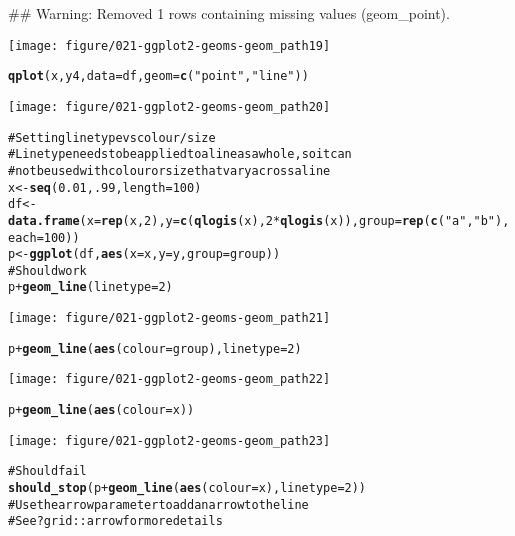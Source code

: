 \documentclass[a4paper,titlepage]{tufte-handout}\usepackage{graphicx, color}
\makeatletter
\def\maxwidth{ %
  \ifdim\Gin@nat@width>\linewidth
    \linewidth
  \else
    \Gin@nat@width
  \fi
}
\newcommand{\hlfunctioncall}[1]{\textcolor[rgb]{0.501960784313725,0,0.329411764705882}{\textbf{#1}}}%
\newcommand{\hlstring}[1]{\textcolor[rgb]{0.6,0.6,1}{#1}}%
\newcommand{\hlcomment}[1]{\textcolor[rgb]{0.180392156862745,0.6,0.341176470588235}{#1}}%
\newenvironment{kframe}{%
 \def\at@end@of@kframe{}%
 \ifinner\ifhmode%
  \def\at@end@of@kframe{\end{minipage}}%
  \begin{minipage}{\columnwidth}%
 \fi\fi%
 \def\FrameCommand##1{\hskip\@totalleftmargin \hskip-\fboxsep
 \colorbox{shadecolor}{##1}\hskip-\fboxsep
     \hskip-\linewidth \hskip-\@totalleftmargin \hskip\columnwidth}%
 \MakeFramed {\advance\hsize-\width
   \@totalleftmargin\z@ \linewidth\hsize
   \@setminipage}}%
 {\par\unskip\endMakeFramed%
 \at@end@of@kframe}
\newenvironment{knitrout}{}{} %
\makeatother
\begin{document}
\begin{knitrout}
\begin{kframe}
{\ttfamily\noindent\textcolor{warningcolor}{\#\# Warning: Removed 1 rows containing missing values (geom\_point).}}\end{kframe}\texttt{[image: figure/021-ggplot2-geoms-geom\_path19]} \begin{kframe}\begin{alltt}
\hlfunctioncall{qplot}(x, y4, data = df, geom = \hlfunctioncall{c}(\hlstring{"point"},\hlstring{"line"}))
\end{alltt}
\end{kframe}\texttt{[image: figure/021-ggplot2-geoms-geom\_path20]} \begin{kframe}\begin{alltt}
\hlcomment{# Setting line type vs colour/size}
\hlcomment{# Line type needs to be applied to a line as a whole, so it can}
\hlcomment{# not be used with colour or size that vary across a line}
x <- \hlfunctioncall{seq}(0.01, .99, length=100)
df <- \hlfunctioncall{data.frame}(x = \hlfunctioncall{rep}(x, 2), y = \hlfunctioncall{c}(\hlfunctioncall{qlogis}(x), 2 * \hlfunctioncall{qlogis}(x)), group = \hlfunctioncall{rep}(\hlfunctioncall{c}(\hlstring{"a"},\hlstring{"b"}), each=100))
p <- \hlfunctioncall{ggplot}(df, \hlfunctioncall{aes}(x=x, y=y, group=group))
\hlcomment{# Should work}
p + \hlfunctioncall{geom_line}(linetype = 2)
\end{alltt}
\end{kframe}\texttt{[image: figure/021-ggplot2-geoms-geom\_path21]} \begin{kframe}\begin{alltt}
p + \hlfunctioncall{geom_line}(\hlfunctioncall{aes}(colour = group), linetype = 2)
\end{alltt}
\end{kframe}\texttt{[image: figure/021-ggplot2-geoms-geom\_path22]} \begin{kframe}\begin{alltt}
p + \hlfunctioncall{geom_line}(\hlfunctioncall{aes}(colour = x))
\end{alltt}
\end{kframe}\texttt{[image: figure/021-ggplot2-geoms-geom\_path23]} \begin{kframe}\begin{alltt}
\hlcomment{# Should fail}
\hlfunctioncall{should_stop}(p + \hlfunctioncall{geom_line}(\hlfunctioncall{aes}(colour = x), linetype=2))
\hlcomment{# Use the arrow parameter to add an arrow to the line}
\hlcomment{# See ?grid::arrow for more details}

\end{alltt}
\end{kframe}
\end{knitrout}
\end{document}
